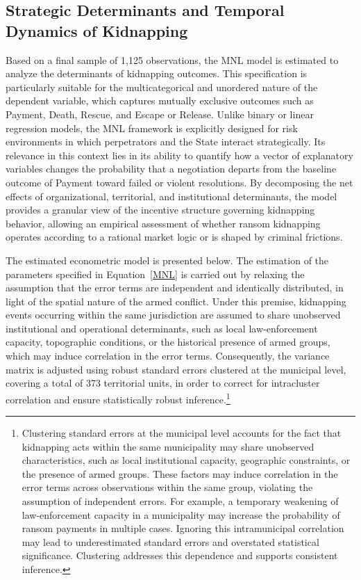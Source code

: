 \documentclass[12pt,a4paper]{article}
\theoremstyle{plain}
\theoremstyle{definition}
\theoremstyle{remark}
\newcommand{\1}{\mathbf{1}}
\begin{document}
\subsection{Strategic Determinants and Temporal Dynamics of Kidnapping}

Based on a final sample of 1,125 observations, the MNL model is estimated to analyze the determinants of kidnapping outcomes. This specification is particularly suitable for the multicategorical and unordered nature of the dependent variable, which captures mutually exclusive outcomes such as Payment, Death, Rescue, and Escape or Release. Unlike binary or linear regression models, the MNL framework is explicitly designed for risk environments in which perpetrators and the State interact strategically. Its relevance in this context lies in its ability to quantify how a vector of explanatory variables changes the probability that a negotiation departs from the baseline outcome of Payment toward failed or violent resolutions. By decomposing the net effects of organizational, territorial, and institutional determinants, the model provides a granular view of the incentive structure governing kidnapping behavior, allowing an empirical assessment of whether ransom kidnapping operates according to a rational market logic or is shaped by criminal frictions.

The estimated econometric model is presented below. The estimation of the parameters specified in Equation~\ref{MNL} is carried out by relaxing the assumption that the error terms are independent and identically distributed, in light of the spatial nature of the armed conflict. Under this premise, kidnapping events occurring within the same jurisdiction are assumed to share unobserved institutional and operational determinants, such as local law-enforcement capacity, topographic conditions, or the historical presence of armed groups, which may induce correlation in the error terms. Consequently, the variance matrix is adjusted using robust standard errors clustered at the municipal level, covering a total of 373 territorial units, in order to correct for intracluster correlation and ensure statistically robust inference.\footnote{Clustering standard errors at the municipal level accounts for the fact that kidnapping acts within the same municipality may share unobserved characteristics, such as local institutional capacity, geographic constraints, or the presence of armed groups. These factors may induce correlation in the error terms across observations within the same group, violating the assumption of independent errors. For example, a temporary weakening of law-enforcement capacity in a municipality may increase the probability of ransom payments in multiple cases. Ignoring this intramunicipal correlation may lead to underestimated standard errors and overstated statistical significance. Clustering addresses this dependence and supports consistent inference.}
\end{document}

